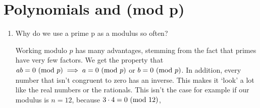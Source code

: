 \documentclass{article}
\begin{document}
    \section{Polynomials and (mod p)}
    \begin{enumerate}
        \item Why do we use a prime p as a modulus so often?
        \begin{solution}
        Working modulo $p$ has many advantages, stemming from the fact that primes have very few factors. We get
        the property that $ab = 0 \textnormal{ (mod } p) \implies a = 0 \textnormal{ (mod } p)$ or $b = 0 \textnormal{ (mod } p)$. In addition, every number that isn't congruent
        to zero has an inverse. This makes it `look' a lot like the real numbers or the rationals. This isn't the case for example if our modulus is $n = 12$, because $3 \cdot 4 = 0 \textnormal{ (mod } 12)$,


\end{solution}
\end{enumerate}
\end{document}
